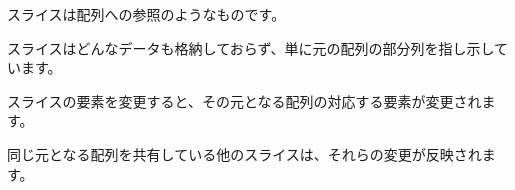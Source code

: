 スライスは配列への参照のようなものです。

スライスはどんなデータも格納しておらず、単に元の配列の部分列を指し示しています。

スライスの要素を変更すると、その元となる配列の対応する要素が変更されます。

同じ元となる配列を共有している他のスライスは、それらの変更が反映されます。